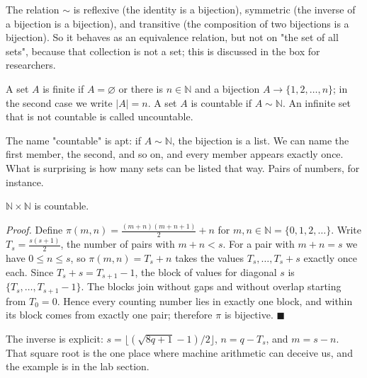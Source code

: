 The relation $\sim$ is reflexive (the identity is a bijection), symmetric (the inverse
of a bijection is a bijection), and transitive (the composition of two bijections is a
bijection). So it behaves as an equivalence relation, but not on "the set of all sets",
because that collection is not a set; this is discussed in the box for researchers.

\begin{definisi}
A set $A$ is finite if $A = \varnothing$ or there is $n \in \mathbb{N}$ and a
bijection $A \to \{1,2,\dots,n\}$; in the second case we write $|A| = n$. A set $A$
is countable if $A \sim \mathbb{N}$. An infinite set that is not countable is called
uncountable.
\end{definisi}


The name "countable" is apt: if $A \sim \mathbb{N}$, the bijection is a list. We can
name the first member, the second, and so on, and every member appears exactly once.
What is surprising is how many sets can be listed that way. Pairs of numbers, for
instance.

\begin{proposisi}
$\mathbb{N} \times \mathbb{N}$ is countable.
\end{proposisi}
\par\smallskip\noindent\textit{Proof.} Define
$\pi(m,n) = \frac{(m+n)(m+n+1)}{2} + n$ for $m, n \in \mathbb{N} =
\{0,1,2,\dots\}$. Write $T_s = \frac{s(s+1)}{2}$, the number of pairs with
$m + n < s$. For a pair with $m + n = s$ we have $0 \le n \le s$, so
$\pi(m,n) = T_s + n$ takes the values $T_s, \dots, T_s + s$ exactly once each. Since
$T_s + s = T_{s+1} - 1$, the block of values for diagonal $s$ is
$\{T_s, \dots, T_{s+1}-1\}$. The blocks join without gaps and without overlap
starting from $T_0 = 0$. Hence every counting number lies in exactly one block, and
within its block comes from exactly one pair; therefore $\pi$ is bijective.
\hfill$\blacksquare${\parfillskip=0pt\par}

The inverse is explicit: $s = \lfloor (\sqrt{8q+1}-1)/2 \rfloor$, $n = q - T_s$, and
$m = s - n$. That square root is the one place where machine arithmetic can deceive
us, and the example is in the lab section.

